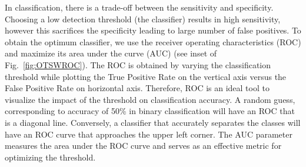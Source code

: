 \documentclass[aps,pra,reprint,superscriptaddress]{revtex4-1}
\begin{document}
In classification, there is a trade-off between the sensitivity and specificity. Choosing a low detection threshold (the classifier) results in high sensitivity, however this sacrifices the specificity leading to large number of false positives. To obtain the optimum classifier, we use the receiver operating characteristics (ROC) and maximize its area under the curve (AUC) (see inset of Fig.~\ref{fig:OTSWROC}). The ROC is obtained by varying the classification threshold while plotting the True Positive Rate on the vertical axis versus the False Positive Rate on horizontal axis. Therefore, ROC is an ideal tool to visualize the impact of the threshold on classification accuracy. A random guess, corresponding to accuracy of 50\% in binary classification will have an ROC that is a diagonal line. Conversely, a classifier that accurately separates the classes will have an ROC curve that approaches the upper left corner. The AUC parameter measures the area under the ROC curve and serves as an effective metric for optimizing the threshold.
\end{document}
